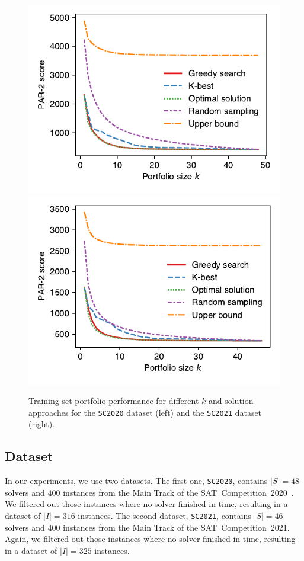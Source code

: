 \documentclass[conference]{IEEEtran}
\begin{document}
\begin{figure}[t]
	\centering
	\includegraphics[width=0.9\columnwidth]{plots/search-train-objective-2020.pdf}
	\qquad
	\includegraphics[width=0.9\columnwidth]{plots/search-train-objective-2021.pdf}
	\caption{Training-set portfolio performance for different $k$ and solution approaches for the \texttt{SC2020} dataset (left) and the \texttt{SC2021} dataset (right).}
	\label{fig:search-train-objective}
\end{figure}

\subsection{Dataset}

In our experiments, we use two datasets.
The first one, \texttt{SC2020}, contains $|S| = 48$ solvers and $400$ instances from the Main Track of the SAT~Competition~2020~\cite{balyo2020proceedings, SC2020:AIJ}.
We filtered out those instances where no solver finished in time, resulting in a dataset of $|I| = 316$ instances. 
The second dataset, \texttt{SC2021}, contains $|S| = 46$ solvers and $400$ instances from the Main Track of the SAT~Competition~2021.
Again, we filtered out those instances where no solver finished in time, resulting in a dataset of $|I| = 325$ instances.
\end{document}
